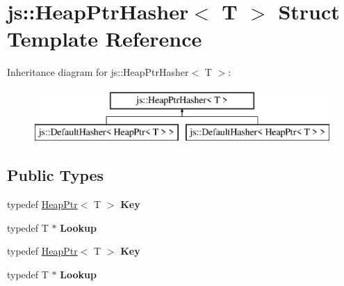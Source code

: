 \hypertarget{structjs_1_1_heap_ptr_hasher}{\section{js\-:\-:Heap\-Ptr\-Hasher$<$ T $>$ Struct Template Reference}
\label{structjs_1_1_heap_ptr_hasher}
}
Inheritance diagram for js\-:\-:Heap\-Ptr\-Hasher$<$ T $>$\-:\begin{figure}[H]
\begin{center}
\leavevmode
\includegraphics[height=2.000000cm]{structjs_1_1_heap_ptr_hasher}
\end{center}
\end{figure}
\subsection*{Public Types}
\begin{DoxyCompactItemize}
\item 
\hypertarget{structjs_1_1_heap_ptr_hasher_a2a7584ca9f6c16cb61123cf8e83697bd}{typedef \hyperlink{classjs_1_1_heap_ptr}{Heap\-Ptr}$<$ T $>$ {\bfseries Key}}\label{structjs_1_1_heap_ptr_hasher_a2a7584ca9f6c16cb61123cf8e83697bd}

\item 
\hypertarget{structjs_1_1_heap_ptr_hasher_a641b59190ed16ed58cea552ce7f76a89}{typedef T $\ast$ {\bfseries Lookup}}\label{structjs_1_1_heap_ptr_hasher_a641b59190ed16ed58cea552ce7f76a89}

\item 
\hypertarget{structjs_1_1_heap_ptr_hasher_a2a7584ca9f6c16cb61123cf8e83697bd}{typedef \hyperlink{classjs_1_1_heap_ptr}{Heap\-Ptr}$<$ T $>$ {\bfseries Key}}\label{structjs_1_1_heap_ptr_hasher_a2a7584ca9f6c16cb61123cf8e83697bd}

\item 
\hypertarget{structjs_1_1_heap_ptr_hasher_a641b59190ed16ed58cea552ce7f76a89}{typedef T $\ast$ {\bfseries Lookup}}\label{structjs_1_1_heap_ptr_hasher_a641b59190ed16ed58cea552ce7f76a89}

\end{DoxyCompactItemize}
